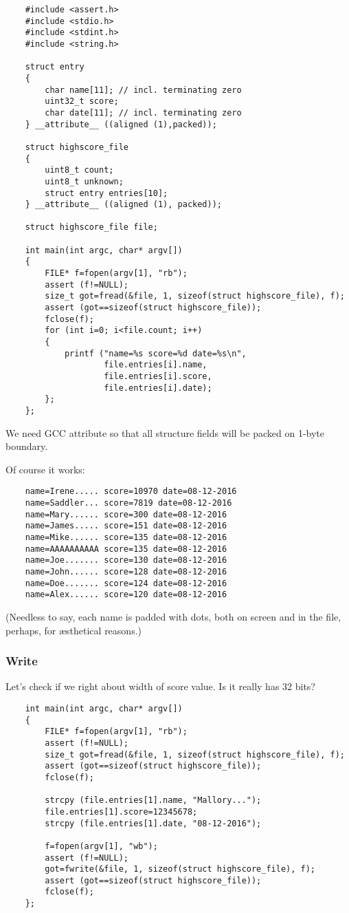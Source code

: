 \begin{lstlisting}
	#include <assert.h>
	#include <stdio.h>
	#include <stdint.h>
	#include <string.h>

	struct entry
	{
		char name[11]; // incl. terminating zero
		uint32_t score;
		char date[11]; // incl. terminating zero
	} __attribute__ ((aligned (1),packed));

	struct highscore_file
	{
		uint8_t count;
		uint8_t unknown;
		struct entry entries[10];
	} __attribute__ ((aligned (1), packed));

	struct highscore_file file;

	int main(int argc, char* argv[])
	{
		FILE* f=fopen(argv[1], "rb");
		assert (f!=NULL);
		size_t got=fread(&file, 1, sizeof(struct highscore_file), f);
		assert (got==sizeof(struct highscore_file));
		fclose(f);
		for (int i=0; i<file.count; i++)
		{
			printf ("name=%s score=%d date=%s\n",
					file.entries[i].name,
					file.entries[i].score,
					file.entries[i].date);
		};
	};
\end{lstlisting}

We need GCC  attribute so that all structure fields will be packed on 1-byte boundary.

Of course it works:

\begin{lstlisting}
	name=Irene..... score=10970 date=08-12-2016
	name=Saddler... score=7819 date=08-12-2016
	name=Mary...... score=300 date=08-12-2016
	name=James..... score=151 date=08-12-2016
	name=Mike...... score=135 date=08-12-2016
	name=AAAAAAAAAA score=135 date=08-12-2016
	name=Joe....... score=130 date=08-12-2016
	name=John...... score=128 date=08-12-2016
	name=Doe....... score=124 date=08-12-2016
	name=Alex...... score=120 date=08-12-2016
\end{lstlisting}

(Needless to say, each name is padded with dots, both on screen and in the file, perhaps, for \ae{}sthetical reasons.)

\subsubsection{Write}

Let's check if we right about width of score value. Is it really has 32 bits?

\begin{lstlisting}
	int main(int argc, char* argv[])
	{
		FILE* f=fopen(argv[1], "rb");
		assert (f!=NULL);
		size_t got=fread(&file, 1, sizeof(struct highscore_file), f);
		assert (got==sizeof(struct highscore_file));
		fclose(f);
	
		strcpy (file.entries[1].name, "Mallory...");
		file.entries[1].score=12345678;
		strcpy (file.entries[1].date, "08-12-2016");
	
		f=fopen(argv[1], "wb");
		assert (f!=NULL);
		got=fwrite(&file, 1, sizeof(struct highscore_file), f);
		assert (got==sizeof(struct highscore_file));
		fclose(f);
	};
\end{lstlisting}

